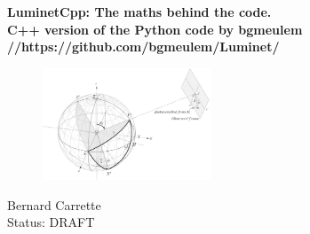 \documentclass{thesis}
\begin{document}
    \begin{titlepage}
    \centering
    \vspace*{\fill}

    \vspace*{0.5cm}

    \large\bfseries
    LuminetCpp: The maths behind the code.\\C++ version of the Python code by bgmeulem\\ //https://github.com/bgmeulem/Luminet/ \\

    \vspace*{0.5cm}

\begin{figure}[H]%
  \centering
  \includegraphics[width=5cm]{./images/Coordinates_system.PNG}
  \label{fig:test}
\end{figure}
    \vspace*{0.5cm}
Bernard Carrette\\
Status: DRAFT
    \vspace*{\fill}
    \end{titlepage}

\tableofcontents
\listoffigures
%

\end{document}
